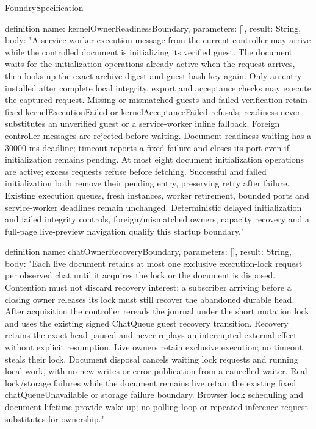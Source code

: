 \begin{lexlean}{FoundrySpecification}
\begin{semanticmodule}
definition{
  name: kernelOwnerReadinessBoundary,
  parameters: [],
  result: String,
  body: "A service-worker execution message from the current controller may arrive while the controlled document is initializing its verified guest. The document waits for the initialization operations already active when the request arrives, then looks up the exact archive-digest and guest-hash key again. Only an entry installed after complete local integrity, export and acceptance checks may execute the captured request. Missing or mismatched guests and failed verification retain fixed kernelExecutionFailed or kernelAcceptanceFailed refusals; readiness never substitutes an unverified guest or a service-worker inline fallback. Foreign controller messages are rejected before waiting. Document readiness waiting has a 30000 ms deadline; timeout reports a fixed failure and closes its port even if initialization remains pending. At most eight document initialization operations are active; excess requests refuse before fetching. Successful and failed initialization both remove their pending entry, preserving retry after failure. Existing execution queues, fresh instances, worker retirement, bounded ports and service-worker deadlines remain unchanged. Deterministic delayed initialization and failed integrity controls, foreign/mismatched owners, capacity recovery and a full-page live-preview navigation qualify this startup boundary."
}

definition{
  name: chatOwnerRecoveryBoundary,
  parameters: [],
  result: String,
  body: "Each live document retains at most one exclusive execution-lock request per observed chat until it acquires the lock or the document is disposed. Contention must not discard recovery interest: a subscriber arriving before a closing owner releases its lock must still recover the abandoned durable head. After acquisition the controller rereads the journal under the short mutation lock and uses the existing signed ChatQueue guest recovery transition. Recovery retains the exact head paused and never replays an interrupted external effect without explicit resumption. Live owners retain exclusive execution; no timeout steals their lock. Document disposal cancels waiting lock requests and running local work, with no new writes or error publication from a cancelled waiter. Real lock/storage failures while the document remains live retain the existing fixed chatQueueUnavailable or storage failure boundary. Browser lock scheduling and document lifetime provide wake-up; no polling loop or repeated inference request substitutes for ownership."
}


\end{semanticmodule}
\end{lexlean}
